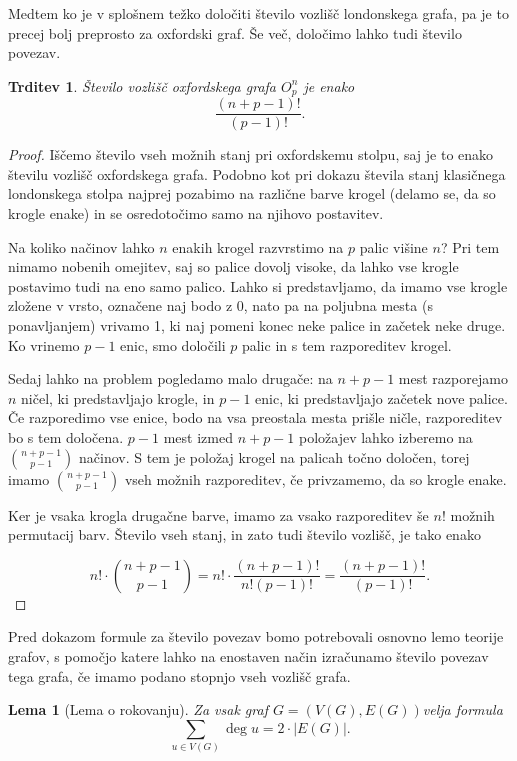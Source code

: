 \documentclass[11pt,a4paper]{article}
\theoremstyle{definition} %
\theoremstyle{plain} %
\newtheorem{lema}[definicija]{Lema}
\newtheorem{trditev}[definicija]{Trditev}
\newcommand{\graf}[1][G]{\ensuremath{#1 = (V(#1), E(#1))}}
\DeclareMathOperator {\stopnja} {deg}
\begin{document}
Medtem ko je v splošnem težko določiti število vozlišč londonskega grafa, pa je to precej bolj preprosto za oxfordski graf. Še več, določimo lahko tudi število povezav.

\begin{trditev}
	Število vozlišč oxfordskega grafa $O^n_p$ je enako \[\frac{(n+p-1)!}{(p-1)!}.\]
\end{trditev}

\begin{proof}
	Iščemo število vseh možnih stanj pri oxfordskemu stolpu, saj je to enako številu vozlišč oxfordskega grafa.
	Podobno kot pri dokazu števila stanj klasičnega londonskega stolpa najprej pozabimo na različne barve krogel (delamo se, da so krogle enake) in se osredotočimo samo na njihovo postavitev. 
	
	Na koliko načinov lahko $n$ enakih krogel razvrstimo na $p$ palic višine $n$? Pri tem nimamo nobenih omejitev, saj so palice dovolj visoke, da lahko vse krogle postavimo tudi na eno samo palico. Lahko si predstavljamo, da imamo vse krogle zložene v vrsto, označene naj bodo z 0, nato pa na poljubna mesta (s ponavljanjem) vrivamo 1, ki naj pomeni konec neke palice in začetek neke druge. Ko vrinemo $p-1$ enic, smo določili $p$ palic in s tem razporeditev krogel. 
	
	Sedaj lahko na problem pogledamo malo drugače: na $n+p-1$ mest razporejamo $n$ ničel, ki predstavljajo krogle, in $p-1$ enic, ki predstavljajo začetek nove palice. Če razporedimo vse enice, bodo na vsa preostala mesta prišle ničle, razporeditev bo s tem določena. $p-1$ mest izmed $n+p-1$ položajev lahko izberemo na ${n+p-1 \choose p-1}$ načinov. S tem je položaj krogel na palicah točno določen, torej imamo ${n+p-1 \choose p-1}$ vseh možnih razporeditev, če privzamemo, da so krogle enake. 
	
	Ker je vsaka krogla drugačne barve, imamo za vsako razporeditev še $n!$ možnih permutacij barv. Število vseh stanj, in zato tudi število vozlišč, je tako enako
	
	\[ n! \cdot {n+p-1 \choose p-1} = n! \cdot \frac{(n+p-1)!}{n!(p-1)!} = \frac{(n+p-1)!}{(p-1)!}. \] \qedhere
\end{proof}

Pred dokazom formule za število povezav bomo potrebovali osnovno lemo teorije grafov, s pomočjo katere lahko na enostaven način izračunamo število povezav tega grafa, če imamo podano stopnjo vseh vozlišč grafa.

\begin{lema}[Lema o rokovanju]
    \label{lema:rokovanje}
    Za vsak graf \graf velja formula
    \begin{equation}
    \sum_{u \in V(G)}\! \stopnja u = 2 \cdot |E(G)|.
    \label{eq:lema-o-rokovanju}
    \end{equation}
\end{lema}
\end{document}
